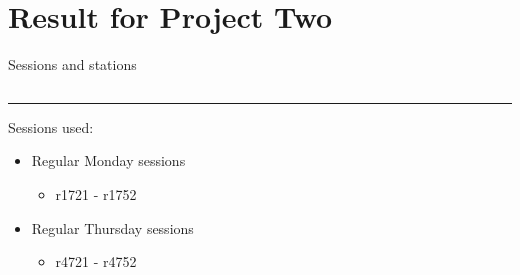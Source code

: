 \documentclass{beamer}
\begin{document}

    \section{Result for Project Two}


    \begin{frame}{Sessions and stations}
        \begin{columns}[T] %
            \begin{column}{.48\textwidth}
            \color{black}\rule{\linewidth}{4pt}

                Sessions used:

                \begin{itemize}
                    \item Regular Monday sessions
                    \begin{itemize}
                        \item r1721 - r1752 
                    \end{itemize}
                    \item Regular Thursday sessions
                    \begin{itemize}
                        \item r4721 - r4752 
                    \end{itemize}
                \end{itemize}


\end{column}
\end{columns}
\end{frame}
\end{document}
